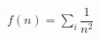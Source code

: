 \documentclass[preview]{standalone}
\begin{document}
\begin{align*}
f( n ) = \sum_i\dfrac{1}{ n ^2}
\end{align*}
\end{document}
